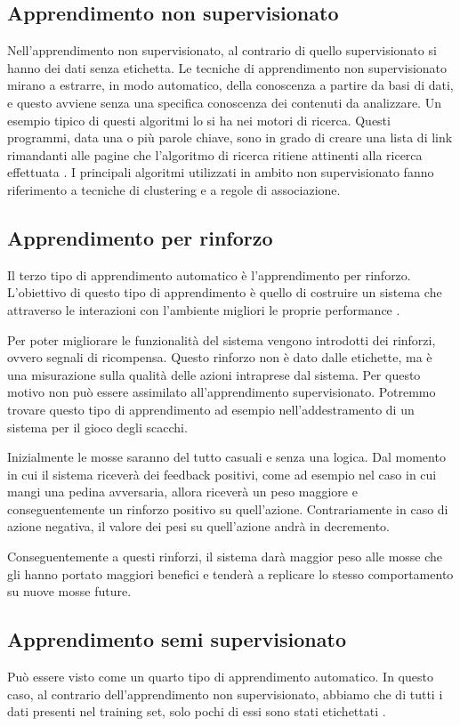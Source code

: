 \documentclass[12pt,italian]{report}
\begin{document}
\subsection{Apprendimento non supervisionato}
Nell’apprendimento non supervisionato, al contrario di quello supervisionato si hanno dei dati senza etichetta. Le tecniche di apprendimento non supervisionato mirano a estrarre, in modo automatico, della conoscenza a partire da basi di dati, e questo avviene senza una specifica conoscenza dei contenuti da analizzare. Un esempio tipico di questi algoritmi lo si ha nei motori di ricerca. Questi programmi, data una o più parole chiave, sono in grado di creare una lista di link rimandanti alle pagine che l'algoritmo di ricerca ritiene attinenti alla ricerca effettuata \cite{unsupervisedlearning}.
I principali algoritmi utilizzati in ambito non supervisionato fanno riferimento a tecniche di clustering e a regole di associazione.
\subsection{Apprendimento per rinforzo}
Il terzo tipo di apprendimento automatico è l’apprendimento per rinforzo. L’obiettivo di questo tipo di apprendimento è quello di costruire un sistema che attraverso le interazioni con l’ambiente migliori le proprie performance \cite{unsupervisedlearning}.

Per poter migliorare le funzionalità del sistema vengono introdotti dei rinforzi, ovvero segnali di ricompensa. Questo rinforzo non è dato dalle etichette, ma è una misurazione sulla qualità delle azioni intraprese dal sistema. Per questo motivo non può essere assimilato all'apprendimento supervisionato.
Potremmo trovare questo tipo di apprendimento ad esempio nell’addestramento di un sistema per il gioco degli scacchi.

Inizialmente le mosse saranno del tutto casuali e senza una logica. Dal momento in cui il sistema riceverà dei feedback positivi, come ad esempio nel caso in cui mangi una pedina avversaria, allora riceverà un peso maggiore e conseguentemente un rinforzo positivo su quell’azione. Contrariamente in caso di azione negativa, il valore dei pesi su quell’azione andrà in decremento.

Conseguentemente a questi rinforzi, il sistema darà maggior peso alle mosse che gli hanno portato maggiori benefici e tenderà a replicare lo stesso comportamento su nuove mosse future.
\subsection{Apprendimento semi supervisionato}
Può essere visto come un quarto tipo di apprendimento automatico. In questo caso, al contrario dell’apprendimento non supervisionato, abbiamo che di tutti i dati presenti nel training set, solo pochi di essi sono stati etichettati \cite{semisupervised}.
\end{document}
